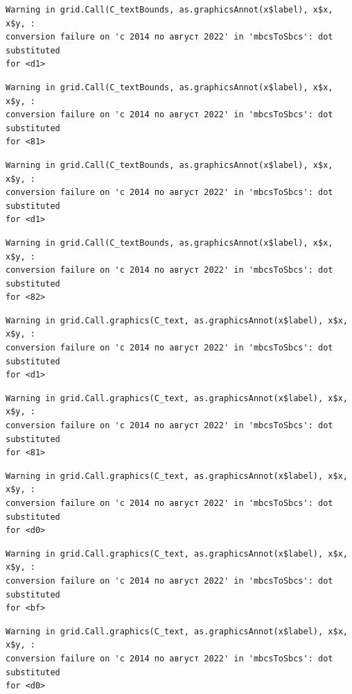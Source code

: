 \documentclass[
  letterpaper,
  DIV=11,
  numbers=noendperiod]{scrartcl}
\begin{document}
\begin{verbatim}
Warning in grid.Call(C_textBounds, as.graphicsAnnot(x$label), x$x, x$y, :
conversion failure on 'с 2014 по август 2022' in 'mbcsToSbcs': dot substituted
for <d1>
\end{verbatim}

\begin{verbatim}
Warning in grid.Call(C_textBounds, as.graphicsAnnot(x$label), x$x, x$y, :
conversion failure on 'с 2014 по август 2022' in 'mbcsToSbcs': dot substituted
for <81>
\end{verbatim}

\begin{verbatim}
Warning in grid.Call(C_textBounds, as.graphicsAnnot(x$label), x$x, x$y, :
conversion failure on 'с 2014 по август 2022' in 'mbcsToSbcs': dot substituted
for <d1>
\end{verbatim}

\begin{verbatim}
Warning in grid.Call(C_textBounds, as.graphicsAnnot(x$label), x$x, x$y, :
conversion failure on 'с 2014 по август 2022' in 'mbcsToSbcs': dot substituted
for <82>
\end{verbatim}

\begin{verbatim}
Warning in grid.Call.graphics(C_text, as.graphicsAnnot(x$label), x$x, x$y, :
conversion failure on 'с 2014 по август 2022' in 'mbcsToSbcs': dot substituted
for <d1>
\end{verbatim}

\begin{verbatim}
Warning in grid.Call.graphics(C_text, as.graphicsAnnot(x$label), x$x, x$y, :
conversion failure on 'с 2014 по август 2022' in 'mbcsToSbcs': dot substituted
for <81>
\end{verbatim}

\begin{verbatim}
Warning in grid.Call.graphics(C_text, as.graphicsAnnot(x$label), x$x, x$y, :
conversion failure on 'с 2014 по август 2022' in 'mbcsToSbcs': dot substituted
for <d0>
\end{verbatim}

\begin{verbatim}
Warning in grid.Call.graphics(C_text, as.graphicsAnnot(x$label), x$x, x$y, :
conversion failure on 'с 2014 по август 2022' in 'mbcsToSbcs': dot substituted
for <bf>
\end{verbatim}

\begin{verbatim}
Warning in grid.Call.graphics(C_text, as.graphicsAnnot(x$label), x$x, x$y, :
conversion failure on 'с 2014 по август 2022' in 'mbcsToSbcs': dot substituted
for <d0>
\end{verbatim}
\end{document}
